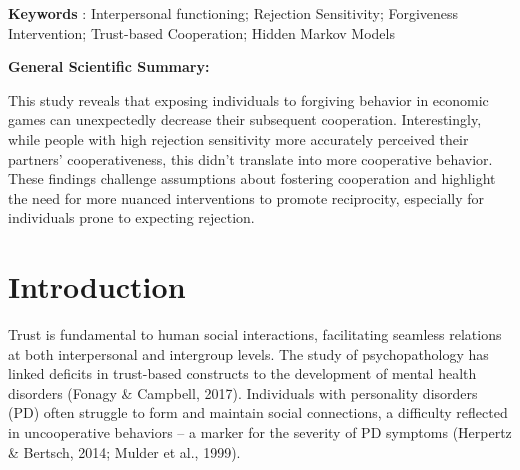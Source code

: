 \documentclass[
]{article}
\begin{document}
\vspace{1cm}

\textbf{Keywords} : Interpersonal functioning; Rejection Sensitivity;
Forgiveness Intervention; Trust-based Cooperation; Hidden Markov Models

\vspace{1cm}

\textbf{General Scientific Summary:}

This study reveals that exposing individuals to forgiving behavior in
economic games can unexpectedly decrease their subsequent cooperation.
Interestingly, while people with high rejection sensitivity more
accurately perceived their partners' cooperativeness, this didn't
translate into more cooperative behavior. These findings challenge
assumptions about fostering cooperation and highlight the need for more
nuanced interventions to promote reciprocity, especially for individuals
prone to expecting rejection.

\pagebreak

\section{Introduction}\label{introduction}

Trust is fundamental to human social interactions, facilitating seamless
relations at both interpersonal and intergroup levels. The study of
psychopathology has linked deficits in trust-based constructs to the
development of mental health disorders (Fonagy \& Campbell, 2017).
Individuals with personality disorders (PD) often struggle to form and
maintain social connections, a difficulty reflected in uncooperative
behaviors -- a marker for the severity of PD symptoms
(Herpertz \& Bertsch, 2014; Mulder et al., 1999).
\end{document}
